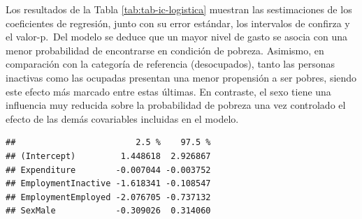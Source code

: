 \documentclass[
  spanish,
  12pt,
]{book}
\begin{document}
Los resultados de la Tabla \ref{tab:tab-ic-logistica} muestran las sestimaciones de los coeficientes de regresión, junto con su error estándar, los intervalos de confirza y el valor-p.~Del modelo se deduce que un mayor nivel de gasto se asocia con una menor probabilidad de encontrarse en condición de pobreza. Asimismo, en comparación con la categoría de referencia (desocupados), tanto las personas inactivas como las ocupadas presentan una menor propensión a ser pobres, siendo este efecto más marcado entre estas últimas. En contraste, el sexo tiene una influencia muy reducida sobre la probabilidad de pobreza una vez controlado el efecto de las demás covariables incluidas en el modelo.

\begin{verbatim}
##                        2.5 %    97.5 %
## (Intercept)         1.448618  2.926867
## Expenditure        -0.007044 -0.003752
## EmploymentInactive -1.618341 -0.108547
## EmploymentEmployed -2.076705 -0.737132
## SexMale            -0.309026  0.314060
\end{verbatim}
\end{document}
